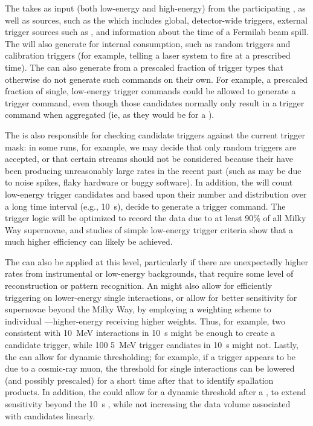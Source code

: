 The  takes as input  (both low-energy
and high-energy) from the participating , as well as
 sources, such as the  which includes
global, detector-wide triggers, external trigger sources such as
, and information about the time of a Fermilab beam
spill. 
The  will also generate  for internal
consumption, such as random triggers and calibration triggers (for
example, telling a laser system to fire at a prescribed time). 
The  can also generate  from a
prescaled fraction of trigger types that otherwise do not generate
such commands on their own. 
For example, a prescaled fraction of single, low-energy trigger
commands could be allowed to generate a trigger command, even though
those candidates normally only result in a trigger command when
aggregated (ie, as they would be for a ).


The  is also responsible for checking candidate triggers
against the current  trigger mask: in some runs, for
example, we may decide that only random triggers are accepted, or that
certain  streams should not be considered
because their  have been producing unreasonably large
rates in the recent past (such as may be due to noise spikes, flaky
hardware or buggy software).
In addition, the  will count low-energy trigger candidates
and based upon their number and distribution over a long time interval
(e.g., \SI{10}{\s}), decide to generate a  trigger command.
The trigger logic will be optimized to record the data due to at least
90\% of all Milky Way supernovae, and studies of simple low-energy
trigger criteria show that a much higher efficiency can likely be
achieved.

	
The  can also be applied at this level, particularly if
there are unexpectedly higher rates from instrumental or low-energy
backgrounds, that require some level of reconstruction or pattern
recognition. 
An  might also allow for efficiently triggering on
lower-energy single interactions, or allow for better sensitivity for
supernovae beyond the Milky Way, by employing a weighting scheme to
individual ---higher-energy
 receiving higher weights. 
Thus, for example, two  consistent with
\SI{10}{\MeV} interactions in \SI{10}{\s} might be enough to create a
 candidate trigger, while 100 \SI{5}{\MeV} trigger
candiates in \SI{10}{\s} might not.
Lastly, the  can allow for dynamic thresholding; for
example, if a trigger appears to be due to a cosmic-ray muon, the
threshold for single interactions can be lowered (and possibly
prescaled) for a short time after that to identify spallation
products. 
In addition, the  could allow for a dynamic threshold after
a , to extend sensitivity beyond the \SI{10}{\s}
 , while not increasing the data
volume associated with  candidates linearly. 

